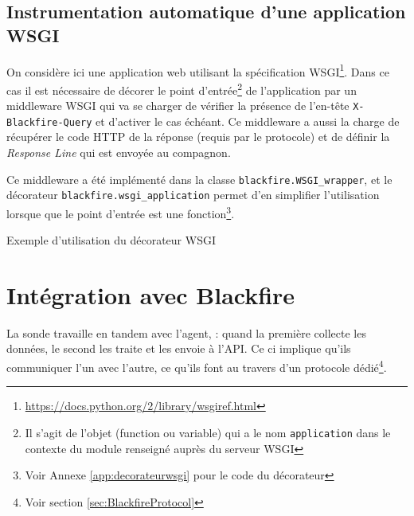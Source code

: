 \section[Application WSGI]{Instrumentation automatique d'une application WSGI}
On considère ici une application web utilisant la spécification WSGI\footnote{\url{https://docs.python.org/2/library/wsgiref.html}}. Dans ce cas il est nécessaire de décorer le point d'entrée\footnote{Il s'agit de l'objet (function ou variable) qui a le nom \verb|application| dans le contexte du module renseigné auprès du serveur WSGI} de l'application par un middleware WSGI qui va se charger de vérifier la présence de l'en-tête \verb|X-Blackfire-Query| et d'activer \Blackfire le cas échéant. Ce middleware a aussi la charge de récupérer le code HTTP de la réponse (requis par le protocole) et de définir la \emph{Response Line} qui est envoyée au compagnon.

Ce middleware a été implémenté dans la classe \verb|blackfire.WSGI_wrapper|, et le décorateur \verb|blackfire.wsgi_application| permet d'en simplifier l'utilisation lorsque que le point d'entrée est une fonction\footnote{Voir Annexe \vref{app:decorateurwsgi} pour le code du décorateur}.

\begin{listing}[H]
\caption{Exemple d'utilisation du décorateur WSGI}
\end{listing}




  \chapter[Intégration]{Intégration avec Blackfire}
  \label{chap:integration}
La sonde travaille en tandem avec l'agent, : quand la première collecte les données, le second les traite et les envoie à l'API. Ce ci implique qu'ils communiquer l'un avec l'autre, ce qu'ils font au travers d'un protocole dédié\footnote{Voir section \vref{sec:BlackfireProtocol}}.


